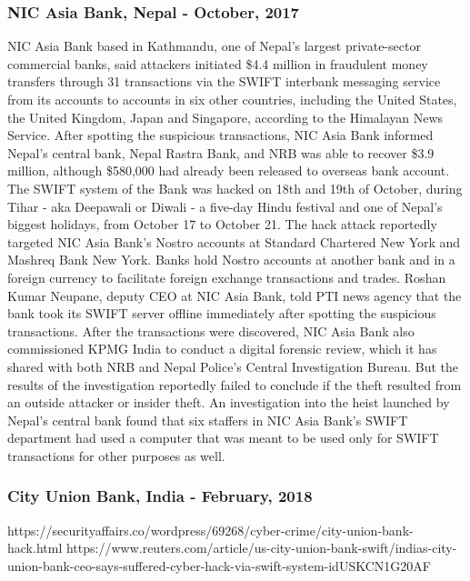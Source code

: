 \documentclass[12pt]{article}
\begin{document}
    \subsubsection{NIC Asia Bank, Nepal - October, 2017}
        NIC Asia Bank based in Kathmandu, one of Nepal's largest private-sector commercial banks, said attackers initiated \$4.4 million in fraudulent money transfers through 31 transactions \cite{NICreport} via the SWIFT interbank messaging service from its accounts to accounts in six other countries, including the United States, the United Kingdom, Japan and Singapore, according to the Himalayan News Service. 
        After spotting the suspicious transactions, NIC Asia Bank informed Nepal's central bank, Nepal Rastra Bank, and NRB was able to recover \$3.9 million, although \$580,000 had already been released to overseas bank account.
        The SWIFT system of the Bank was hacked on 18th and 19th of October, during Tihar - aka Deepawali or Diwali - a five-day Hindu festival and one of Nepal's biggest holidays, from October 17 to October 21.
        The hack attack reportedly targeted NIC Asia Bank's Nostro accounts at Standard Chartered New York and Mashreq Bank New York. Banks hold Nostro accounts at another bank and in a foreign currency to facilitate foreign exchange transactions and trades.
        Roshan Kumar Neupane, deputy CEO at NIC Asia Bank, told PTI news agency that the bank took its SWIFT server offline immediately after spotting the suspicious transactions. After the transactions were discovered, NIC Asia Bank also commissioned KPMG India to conduct a digital forensic review, which it has shared with both NRB and Nepal Police's Central Investigation Bureau. But the results of the investigation reportedly failed to conclude if the theft resulted from an outside attacker or insider theft.
        An investigation into the heist launched by Nepal's central bank found that six staffers in NIC Asia Bank's SWIFT department had used a computer that was meant to be used only for SWIFT transactions for other purposes as well.\cite{ReportAttackersHacked}\cite{NICAsiaBank2017}
        
        
    \subsubsection{City Union Bank, India -  February, 2018}
        
        https://securityaffairs.co/wordpress/69268/cyber-crime/city-union-bank-hack.html
        https://www.reuters.com/article/us-city-union-bank-swift/indias-city-union-bank-ceo-says-suffered-cyber-hack-via-swift-system-idUSKCN1G20AF
        
\end{document}
